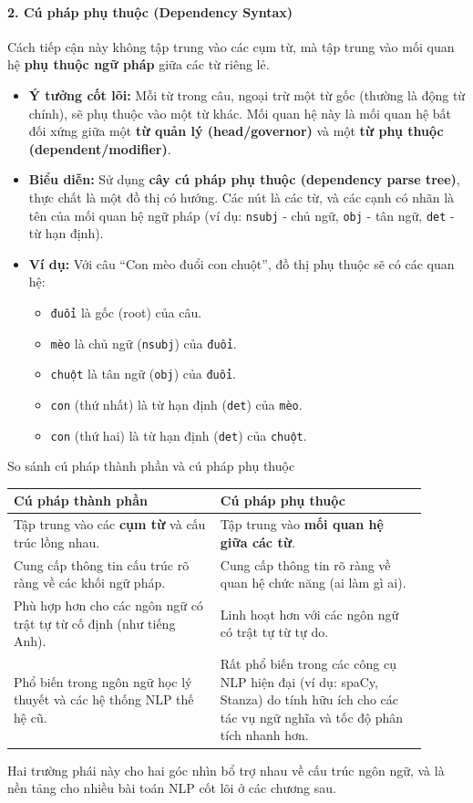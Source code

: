\paragraph{2. Cú pháp phụ thuộc (Dependency Syntax)}
Cách tiếp cận này không tập trung vào các cụm từ, mà tập trung vào mối quan hệ \textbf{phụ thuộc ngữ pháp} giữa các từ riêng lẻ.
\begin{itemize}
    \item \textbf{Ý tưởng cốt lõi:} Mỗi từ trong câu, ngoại trừ một từ gốc (thường là động từ chính), sẽ phụ thuộc vào một từ khác. Mối quan hệ này là mối quan hệ bất đối xứng giữa một \textbf{từ quản lý (head/governor)} và một \textbf{từ phụ thuộc (dependent/modifier)}.
    \item \textbf{Biểu diễn:} Sử dụng \textbf{cây cú pháp phụ thuộc (dependency parse tree)}, thực chất là một đồ thị có hướng. Các nút là các từ, và các cạnh có nhãn là tên của mối quan hệ ngữ pháp (ví dụ: \texttt{nsubj} - chủ ngữ, \texttt{obj} - tân ngữ, \texttt{det} - từ hạn định).
    \item \textbf{Ví dụ:} Với câu “Con mèo đuổi con chuột”, đồ thị phụ thuộc sẽ có các quan hệ:
    
    \begin{itemize}
        \item \texttt{đuổi} là gốc (root) của câu.
        \item \texttt{mèo} là chủ ngữ (\texttt{nsubj}) của \texttt{đuổi}.
        \item \texttt{chuột} là tân ngữ (\texttt{obj}) của \texttt{đuổi}.
        \item \texttt{con} (thứ nhất) là từ hạn định (\texttt{det}) của \texttt{mèo}.
        \item \texttt{con} (thứ hai) là từ hạn định (\texttt{det}) của \texttt{chuột}.
    \end{itemize}
\end{itemize}

\begin{assess}{So sánh cú pháp thành phần và cú pháp phụ thuộc}
\begin{tabular}{p{0.45\linewidth} | p{0.45\linewidth}}
    \textbf{Cú pháp thành phần} & \textbf{Cú pháp phụ thuộc} \\
    \hline
    Tập trung vào các \textbf{cụm từ} và cấu trúc lồng nhau. & Tập trung vào \textbf{mối quan hệ giữa các từ}. \\
    \hline
    Cung cấp thông tin cấu trúc rõ ràng về các khối ngữ pháp. & Cung cấp thông tin rõ ràng về quan hệ chức năng (ai làm gì ai). \\
    \hline
    Phù hợp hơn cho các ngôn ngữ có trật tự từ cố định (như tiếng Anh). & Linh hoạt hơn với các ngôn ngữ có trật tự từ tự do. \\
    \hline
    Phổ biến trong ngôn ngữ học lý thuyết và các hệ thống NLP thế hệ cũ. & Rất phổ biến trong các công cụ NLP hiện đại (ví dụ: spaCy, Stanza) do tính hữu ích cho các tác vụ ngữ nghĩa và tốc độ phân tích nhanh hơn. \\
\end{tabular}
\end{assess}

Hai trường phái này cho hai góc nhìn bổ trợ nhau về cấu trúc ngôn ngữ, và là nền tảng cho nhiều bài toán NLP cốt lõi ở các chương sau.